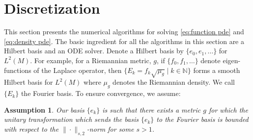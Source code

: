 \documentclass[final,leqno]{siamart}
\newcommand{\ram}[1]{{\normalsize{\textbf{({\color{red}RAMBO:\ }#1)}}}}
\newtheorem{ass}[theorem]{Assumption}
\begin{document}
%
%

\section{Discretization} \label{sec:discretization}
This section presents the numerical algorithms for solving \eqref{eq:function pde} and \eqref{eq:density pde}.
The basic ingredient for all the algorithms in this section are a Hilbert basis and an ODE solver.
Denote a Hilbert basis by $\{ e_{0}, e_{1},\dots \}$ for $L^{2}(M)$.
For example, for a Riemannian metric, $g$, if $\{ f_{0}, f_{1},\dots \}$ denote eigen-functions of the Laplace operator, then $\{ E_{k} = f_{k} \sqrt{\mu_{g}} \mid k \in \mathbb{N} \}$ forms a smooth Hilbert basis for $L^{2}(M)$ where $\mu_{g}$ denotes the Riemannian density.  We call $\{ E_{k} \}$ the Fourier basis.
To ensure convergence, we assume:
\begin{ass} \label{ass:basis}
	Our basis $\{ e_{k} \}$ is such that there exists a metric $g$ for which the unitary transformation which sends the basis $\{ e_{k} \}$ to the Fourier basis is bounded with respect to the $\| \cdot \|_{s,2}$-norm for some $s > 1$.
\end{ass}

\end{document}
